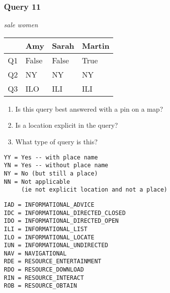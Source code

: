 \begin{frame}[fragile]
\frametitle{Query 11}
\vspace{1em}

\emph{sale women}

\vfill

\begin{table}
  \centering
  \begin{tabular}{ l l l l }
    & \textbf{Amy} & \textbf{Sarah} & \textbf{Martin}\\
    \toprule
    Q1 & False & False & True\\
Q2 & NY & NY & NY\\
Q3 & ILO & ILI & ILI\\
    \bottomrule
  \end{tabular}
\end{table}

\vfill

\tiny{

\begin{enumerate}
\item Is this query best answered with a pin on a map?
\item Is a location explicit in the query?
\item What type of query is this?
\end{enumerate}

\vfill

\begin{multicols}{2}
\begin{verbatim}
YY = Yes -- with place name
YN = Yes -- without place name
NY = No (but still a place)
NN = Not applicable 
     (ie not explicit location and not a place)
\end{verbatim}

\columnbreak
\begin{verbatim}
IAD = INFORMATIONAL_ADVICE
IDC = INFORMATIONAL_DIRECTED_CLOSED
IDO = INFORMATIONAL_DIRECTED_OPEN
ILI = INFORMATIONAL_LIST
ILO = INFORMATIONAL_LOCATE
IUN = INFORMATIONAL_UNDIRECTED
NAV = NAVIGATIONAL
RDE = RESOURCE_ENTERTAINMENT
RDO = RESOURCE_DOWNLOAD
RIN = RESOURCE_INTERACT
ROB = RESOURCE_OBTAIN
\end{verbatim}
\end{multicols}
}

\end{frame}


